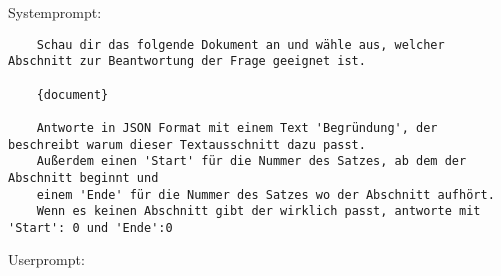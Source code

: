 Systemprompt:

\begin{verbatim}
    Schau dir das folgende Dokument an und wähle aus, welcher Abschnitt zur Beantwortung der Frage geeignet ist.

    {document}

    Antworte in JSON Format mit einem Text 'Begründung', der beschreibt warum dieser Textausschnitt dazu passt. 
    Außerdem einen 'Start' für die Nummer des Satzes, ab dem der Abschnitt beginnt und 
    einem 'Ende' für die Nummer des Satzes wo der Abschnitt aufhört.
    Wenn es keinen Abschnitt gibt der wirklich passt, antworte mit 'Start': 0 und 'Ende':0

\end{verbatim}

Userprompt:

\begin{verbatim}
  

\end{verbatim}